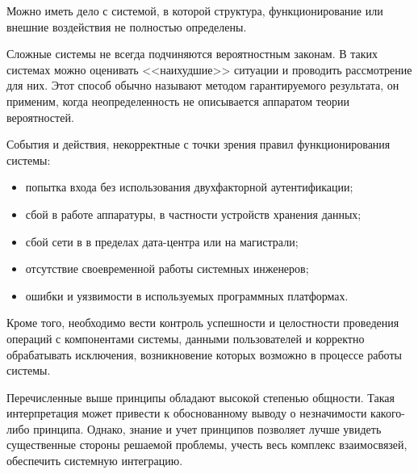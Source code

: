 Можно иметь дело с системой, в которой структура, функционирование или внешние воздействия не полностью определены.

Сложные системы не всегда подчиняются вероятностным законам.
В таких системах можно оценивать <<наихудшие>> ситуации и проводить рассмотрение для них.
Этот способ обычно называют методом гарантируемого результата, он применим, когда неопределенность не описывается аппаратом теории вероятностей.

События и действия, некорректные с точки зрения правил функционирования системы:
\begin{itemize}
  \item попытка входа без использования двухфакторной аутентификации;
  \item сбой в работе аппаратуры, в частности устройств хранения данных;
  \item сбой сети в в пределах дата-центра или на магистрали;
  \item отсутствие своевременной работы системных инженеров;
  \item ошибки и уязвимости в используемых программных платформах.
\end{itemize}

Кроме того, необходимо вести контроль успешности и целостности проведения операций с компонентами системы, данными пользователей и корректно обрабатывать исключения, возникновение которых возможно в процессе работы системы.

Перечисленные выше принципы обладают высокой степенью общности.
Такая интерпретация может привести к обоснованному выводу о незначимости какого-либо принципа.
Однако, знание и учет принципов позволяет лучше увидеть существенные стороны решаемой проблемы, учесть весь комплекс взаимосвязей, обеспечить системную интеграцию.

\clearpage
